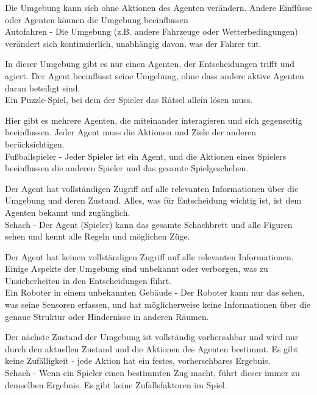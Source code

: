 \begin{infoBox}[title=Dynamisch]
    Die Umgebung kann sich ohne Aktionen des Agenten verändern. Andere Einflüsse oder Agenten können die Umgebung beeinflussen\\
     Autofahren - Die Umgebung (z.B. andere Fahrzeuge oder Wetterbedingungen) verändert sich kontinuierlich, unabhängig davon, was der Fahrer tut.
\end{infoBox}
\begin{infoBox}[title=Einzelagent]
    In dieser Umgebung gibt es nur einen Agenten, der Entscheidungen trifft und agiert. Der Agent beeinflusst seine Umgebung, ohne dass andere aktive Agenten daran beteiligt sind.\\
     Ein Puzzle-Spiel, bei dem der Spieler das Rätsel allein lösen muss.
\end{infoBox}
\begin{infoBox}[title=Mehragenten]
    Hier gibt es mehrere Agenten, die miteinander interagieren und sich gegenseitig beeinflussen. Jeder Agent muss die Aktionen und Ziele der anderen berücksichtigen.\\
     Fußballspieler - Jeder Spieler ist ein Agent, und die Aktionen eines Spielers beeinflussen die anderen Spieler und das gesamte Spielgeschehen.
\end{infoBox}
\begin{infoBox}[title=Zugänglich]
    Der Agent hat vollständigen Zugriff auf alle relevanten Informationen über die Umgebung und deren Zustand. Alles, was für Entscheidung wichtig ist, ist dem Agenten bekannt und zugänglich.\\
     Schach - Der Agent (Spieler) kann das gesamte Schachbrett und alle Figuren sehen und kennt alle Regeln und möglichen Züge.
\end{infoBox}
\begin{infoBox}[title=Unzugänglich]
    Der Agent hat keinen vollständigen Zugriff auf alle relevanten Informationen. Einige Aspekte der Umgebung sind unbekannt oder verborgen, was zu Unsicherheiten in den Entscheidungen führt.\\
     Ein Roboter in einem unbekannten Gebäude - Der Roboter kann nur das sehen, was seine Sensoren erfassen, und hat möglicherweise keine Informationen über die genaue Struktur oder Hindernisse in anderen Räumen.
\end{infoBox}
\begin{infoBox}[title=Deterministische vs. Nicht-deterministische/Stochastische Umgebung]
     Der nächste Zustand der Umgebung ist vollständig vorhersahbar und wird nur durch den aktuellen Zustand und die Aktionen des Agenten bestimmt. Es gibt keine Zufälligkeit - jede Aktion hat ein festes, vorhersehbares Ergebnis.\\
     Schach - Wenn ein Spieler einen bestimmten Zug macht, führt dieser immer zu demselben Ergebnis. Es gibt keine Zufallsfaktoren im Spiel.
\end{infoBox}
